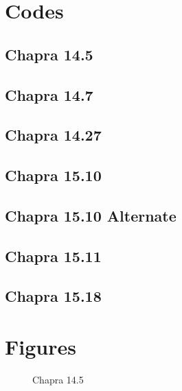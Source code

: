 \documentclass{article}
\begin{document}
\pagebreak
\appendix
\section{Codes}
\lstset{style=python103, language=python} 

\subsection{Chapra 14.5}

\pagebreak

\subsection{Chapra 14.7}

\pagebreak

\subsection{Chapra 14.27}

\pagebreak

\subsection{Chapra 15.10}

\pagebreak

\subsection{Chapra 15.10 Alternate}

\pagebreak

\subsection{Chapra 15.11}

\pagebreak

\subsection{Chapra 15.18}

\pagebreak


\section{Figures}
\begin{figure}[h!]
\begin{center}
\caption{Chapra 14.5}
\end{center}
\end{figure}
\end{document}
